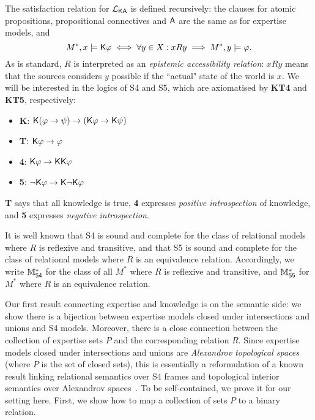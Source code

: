 The satisfaction relation for $\mathcal{L}_{\mathsf{K}\mathsf{A}}$ is defined recursively: the clauses
for atomic propositions, propositional connectives and $\mathsf{A}$ are the same
as for expertise models, and
\[
    M^*, x \models \mathsf{K}\varphi
    \iff
    \forall y \in X: xRy \implies M^*, y \models \varphi.
\]
As is standard, $R$ is interpreted as an \emph{epistemic accessibility relation}:
$xRy$ means that the sources considers $y$ possible if the ``actual"
state of the world is $x$. We will be interested in the logics of S4 and
S5, which are axiomatised by \textbf{KT4} and \textbf{KT5}, respectively:

\begin{itemize}
    \item \textbf{K}: $\mathsf{K}(\varphi \to \psi) \to (\mathsf{K}\varphi \to
          \mathsf{K}\psi)$

    \item \textbf{T}: $\mathsf{K}\varphi \to \varphi$

    \item \textbf{4}: $\mathsf{K}\varphi \to \mathsf{K}\mathsf{K}\varphi$

    \item \textbf{5}: $\neg\mathsf{K}\varphi \to \mathsf{K}\neg\mathsf{K}\varphi$

\end{itemize}

\textbf{T} says that all knowledge is true, \textbf{4} expresses \emph{positive
introspection} of knowledge, and \textbf{5} expresses \emph{negative
introspection}.

It is well known that S4 is sound and complete for the class of relational
models where $R$ is reflexive and transitive, and that S5 is sound and complete
for the class of relational models where $R$ is an equivalence relation.
Accordingly, we write $\mathbb{M}^*_{\mathsf{S4}}$ for the class of all $M^*$ where $R$ is
reflexive and transitive, and $\mathbb{M}^*_{\mathsf{S5}}$ for $M^*$ where $R$ is an equivalence
relation.

Our first result connecting expertise and knowledge is on the semantic side: we
show there is a bijection between expertise models closed under intersections
and unions and S4 models. Moreover, there is a close connection between the
collection of expertise sets $P$ and the corresponding relation $R$.
Since expertise models closed under intersections and unions
are \emph{Alexandrov topological spaces} (where $P$ is the set of closed sets),
this is essentially a reformulation of a known result linking relational
semantics over S4 frames and topological interior semantics over Alexandrov
spaces~\citep{van2007modal,ozgun_evidence}.\footnotemark{} To be self-contained,
we prove it for our setting here. First, we show how to map a collection of
sets $P$ to a binary relation.


